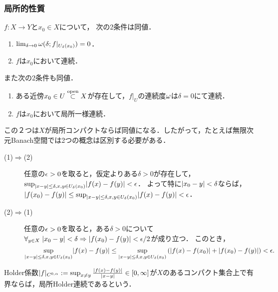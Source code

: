 \documentclass[uplatex,dvipdfmx]{jsreport}
\begin{document}
\subsubsection{局所的性質}

\begin{lemma}
    $f:X\to Y$と$x_0\in X$について，
    次の2条件は同値．
    \begin{enumerate}
        \item $\lim_{\delta\to0}\omega(\delta;f|_{U_\delta(x_0)})=0$．
        \item $f$は$x_0$において連続．
    \end{enumerate}
    また次の2条件も同値．
    \begin{enumerate}
        \item ある近傍$x_0\in U\overset{\mathrm{open}}{\subset} X$が存在して，$f|_U$の連続度$\omega$は$\delta=0$にて連続．
        \item $f$は$x_0$において局所一様連続．
    \end{enumerate}
\end{lemma}
\begin{remark}
    この２つは$X$が局所コンパクトならば同値になる．したがって，たとえば無限次元Banach空間では2つの概念は区別する必要がある．
\end{remark}
\begin{Proof}\mbox{}
    \begin{description}
        \item[(1)$\Rightarrow$(2)] 
        任意の$\epsilon>0$を取ると，仮定よりある$\delta>0$が存在して，$\sup_{\lvert x-y\rvert\le\delta,x,y\in U_{\delta}(x_0)}\lvert f(x)-f(y)\rvert<\epsilon$．
        よって特に$\lvert x_0-y\rvert<\delta$ならば，$\lvert f(x_0)-f(y)\rvert\le \sup_{\lvert x-y\rvert\le\delta,x,y\in U_{\delta}(x_0)}\lvert f(x)-f(y)\rvert<\epsilon$．
        \item[(2)$\Rightarrow$(1)]
        任意の$\epsilon>0$を取ると，ある$\delta>0$について$\forall_{y\in X}\;\lvert x_0-y\rvert<\delta\Rightarrow\lvert f(x_0)-f(y)\rvert<\epsilon/2$が成り立つ．
        このとき，
        \[\sup_{\lvert x-y\rvert\le\delta,x,y\in U_\delta(x_0)}\lvert f(x)-f(y)\rvert\le\sup_{\lvert x-y\rvert\le\delta,x,y\in U_\delta(x_0)}\left(\lvert f(x)-f(x_0)\rvert+\lvert f(x_0)-f(y)\rvert\right)<\epsilon.\]
    \end{description}
\end{Proof}

\begin{definition}
    Holder係数$\lvert f\rvert_{C^{0,\alpha}}:=\sup_{x\ne y}\frac{\lvert f(x)-f(y)\rvert}{\lvert x-y\rvert}\in[0,\infty]$が$X$のあるコンパクト集合上で有界ならば，局所Holder連続であるという．
\end{definition}
\end{document}
